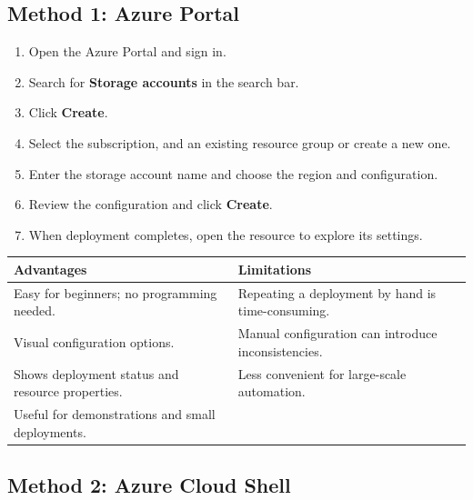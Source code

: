 \documentclass[11pt,a4paper]{article}
\begin{document}
\subsection{Method 1: Azure Portal}



\begin{enumerate}\itemsep2pt
  \item Open the Azure Portal and sign in.
  \item Search for \textbf{Storage accounts} in the search bar.
  \item Click \textbf{Create}.
  \item Select the subscription, and an existing resource group or create a new one.
  \item Enter the storage account name and choose the region and configuration.
  \item Review the configuration and click \textbf{Create}.
  \item When deployment completes, open the resource to explore its settings.
\end{enumerate}

\begin{tabularx}{\textwidth}{@{}XX@{}}
\toprule
\rowcolor{tablehead}\textbf{Advantages} & \textbf{Limitations} \\
\midrule
Easy for beginners; no programming needed. & Repeating a deployment by hand is
  time-consuming. \\
Visual configuration options. & Manual configuration can introduce inconsistencies. \\
Shows deployment status and resource properties. & Less convenient for large-scale
  automation. \\
Useful for demonstrations and small deployments. & \\
\bottomrule
\end{tabularx}

\subsection{Method 2: Azure Cloud Shell}

\end{document}
